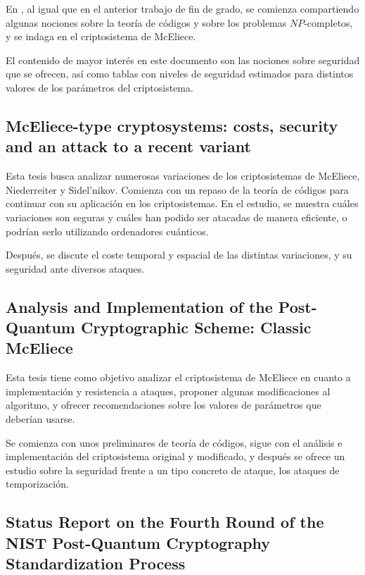 En \autocite{Codes2024}, al igual que en el anterior trabajo de fin de grado, se comienza compartiendo algunas nociones sobre la teoría de códigos y sobre los problemas $NP$-completos, y se indaga en el criptosistema de McEliece.

El contenido de mayor interés en este documento son las nociones sobre seguridad que se ofrecen, así como tablas con niveles de seguridad estimados para distintos valores de los parámetros del criptosistema.

\subsection{McEliece-type cryptosystems: costs, security and an attack to a recent variant}

Esta tesis \autocite{costs} busca analizar numerosas variaciones de los criptosistemas de McEliece, Niederreiter y Sidel'nikov. Comienza con un repaso de la teoría de códigos para continuar con su aplicación en los criptosistemas. En el estudio, se muestra cuáles variaciones son seguras y cuáles han podido ser atacadas de manera eficiente, o podrían serlo utilizando ordenadores cuánticos.

Después, se discute el coste temporal y espacial de las distintas variaciones, y su seguridad ante diversos ataques.

\subsection{Analysis and Implementation of the Post-Quantum Cryptographic Scheme: Classic McEliece}

Esta tesis \autocite{implementation} tiene como objetivo analizar el criptosistema de McEliece en cuanto a implementación y resistencia a ataques, proponer algunas modificaciones al algoritmo, y ofrecer recomendaciones sobre los valores de parámetros que deberían usarse.

Se comienza con unos preliminares de teoría de códigos, sigue con el análisis e implementación del criptosistema original y modificado, y después se ofrece un estudio sobre la seguridad frente a un tipo concreto de ataque, los ataques de temporización.

\subsection{Status Report on the Fourth Round of the NIST Post-Quantum Cryptography Standardization Process}

